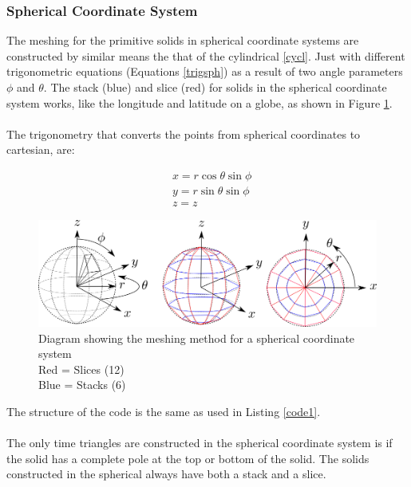 \documentclass[12pt,a4paper]{article}
\begin{document}
\newpage
\subsubsection{Spherical Coordinate System}

The meshing for the primitive solids in spherical coordinate systems are constructed by similar means the that of the cylindrical \ref{cycl}. Just with different trigonometric equations (Equations \ref{trigsph}) as a result of two angle parameters $\phi$ and $\theta$. The stack (blue) and slice (red) for solids in the spherical coordinate system works, like the longitude and latitude on a globe, as shown in Figure \ref{sphmeshin}. 
\\\\
The trigonometry that converts the points from spherical coordinates to cartesian, are:

\begin{equation}
\begin{aligned}
& x = r \cos{\theta}\sin{\phi}\\
& y = r \sin{\theta}\sin{\phi} \\
& z = z
\end{aligned}
\label{trigsph}
\end{equation}
\begin{figure}[h!]
\centering
\includegraphics[scale=0.5]{Images//Coords//sph.png}
\caption[width=\columnwidth]{Diagram showing the meshing method for a spherical coordinate system\\
Red = Slices (12)\\
Blue = Stacks (6)}
\label{sphmeshin}
\end{figure}

\noindent The structure of the code is the same as used in Listing \ref{code1}.\\\\
\noindent The only time triangles are constructed in the spherical coordinate system is if the solid has a complete pole at the top or bottom of the solid. The solids constructed in the spherical always have both a stack and a slice.
\end{document}
